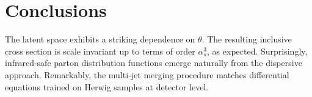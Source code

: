 \section{Conclusions}\label{sec:conclusions}

The latent space exhibits a striking dependence on $\theta$. The
resulting inclusive cross section is scale invariant up to terms of
order $\alpha_s^3$, as expected. Surprisingly, infrared-safe parton
distribution functions emerge naturally from the dispersive approach.
Remarkably, the multi-jet merging procedure matches differential
equations trained on Herwig samples at detector level.

